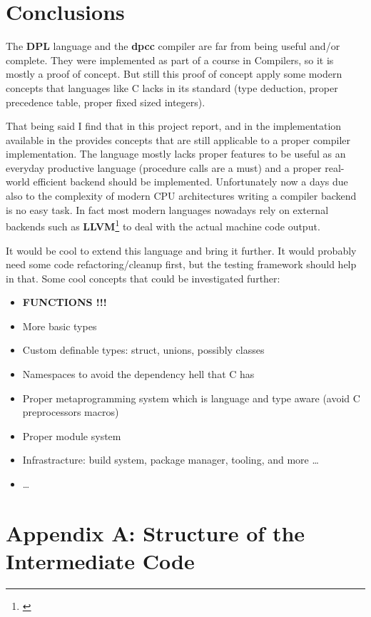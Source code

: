 \documentclass[a4paper]{article}
\newcommand{\urlref}[3][blue]{\href{#2}{\color{#1}{#3}}}%
\begin{document}
\section{Conclusions}

The \textbf{DPL} language and the \textbf{dpcc} compiler are far from being useful and/or complete.
They were implemented as part of a course in Compilers, so it is mostly a proof of concept. But still
this proof of concept apply some modern concepts that languages like C lacks in its standard (type deduction, proper precedence table, proper fixed sized integers).

That being said I find that in this project report, and in the implementation available in the \urlref{https://github.com/dparo/dpcc}{Github Repo}
provides concepts that are still applicable to a proper compiler implementation.
The language mostly lacks proper features to be useful as an everyday productive language (procedure calls are a must)
and a proper real-world efficient backend should be implemented. Unfortunately now a days due also to the complexity
of modern CPU architectures writing a compiler backend is no easy task. In fact most modern languages
nowadays rely on external backends such as \textbf{LLVM}\footnote{\urlref{https://llvm.org/}{LLVM Website}} to deal with the actual machine code output.

It would be cool to extend this language and bring it further. It would probably need some code refactoring/cleanup first,
but the testing framework should help in that. Some cool concepts that could be investigated further:

\begin{itemize}
\item \textbf{FUNCTIONS !!!}
\item More basic types
\item Custom definable types: struct, unions, possibly classes
\item Namespaces to avoid the dependency hell that C has
\item Proper metaprogramming system which is language and type aware (avoid C preprocessors macros)
\item Proper module system
\item Infrastracture: build system, package manager, tooling, and more \dots
\item \dots
\end{itemize}

\clearpage
\section{Appendix A: Structure of the Intermediate Code}
\label{appendix_a}
\end{document}
